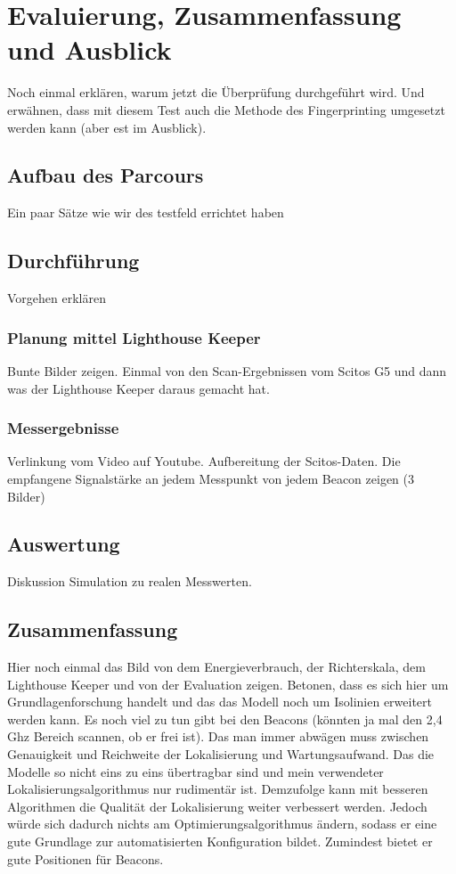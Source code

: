 \chapter{Evaluierung, Zusammenfassung und Ausblick}
Noch einmal erklären, warum jetzt die Überprüfung durchgeführt wird. Und erwähnen, dass mit diesem Test auch die Methode des Fingerprinting umgesetzt werden kann (aber est im Ausblick). 
\section{Aufbau des Parcours}
Ein paar Sätze wie wir des testfeld errichtet haben 

\section{Durchführung}
Vorgehen erklären
\subsection{Planung mittel Lighthouse Keeper}
Bunte Bilder zeigen. Einmal von den Scan-Ergebnissen vom Scitos G5 und dann was der Lighthouse Keeper daraus gemacht hat.
\subsection{Messergebnisse}
Verlinkung vom Video auf Youtube. Aufbereitung der Scitos-Daten. Die empfangene Signalstärke an jedem Messpunkt von jedem Beacon zeigen (3 Bilder)

\section{Auswertung}
Diskussion Simulation zu realen Messwerten.

\section{Zusammenfassung}
Hier noch einmal das Bild von dem Energieverbrauch, der Richterskala, dem Lighthouse Keeper und von der Evaluation zeigen. Betonen, dass es sich hier um Grundlagenforschung handelt und das das Modell noch um Isolinien erweitert werden kann. Es noch viel zu tun gibt bei den Beacons (könnten ja mal den 2,4 Ghz Bereich scannen, ob er frei ist). Das man immer abwägen muss zwischen Genauigkeit und Reichweite der Lokalisierung und Wartungsaufwand. Das die Modelle so nicht eins zu eins übertragbar sind und mein verwendeter Lokalisierungsalgorithmus nur rudimentär ist. Demzufolge kann mit besseren Algorithmen die Qualität der Lokalisierung weiter verbessert werden. Jedoch würde sich dadurch nichts am Optimierungsalgorithmus ändern, sodass er eine gute Grundlage zur automatisierten Konfiguration bildet. Zumindest bietet er gute Positionen für Beacons. 

